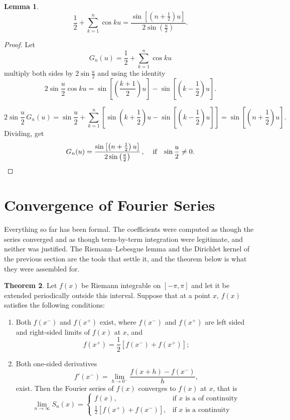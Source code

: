 \documentclass[12pt,a4paper]{report}
\theoremstyle{definition}
\newtheorem{thm}{Theorem}[section]
\theoremstyle{plain}
\newtheorem{lem}[thm]{Lemma}
\begin{document}
\begin{lem}
$$\frac{1}{2} + \sum_{k = 1}^n\cos ku = \frac{\sin\left[(n + \frac{1}{2})u\right]}{2\sin\left(\frac{u}{2}\right)}.$$
\end{lem}

\begin{proof}
Let $$G_n(u) = \frac{1}{2} + \sum^n_{k = 1}\cos ku$$ multiply both sides by $2\sin \frac{u}{2}$ and using the identity $$2\sin \frac{u}{2}\cos ku = \sin \left[\left(\frac{k + 1}{2}\right)u\right] - \sin\left[\left(k - \frac{1}{2}\right)u\right].$$

$$2\sin \frac{u}{2}\, G_n(u) = \sin \frac{u}{2} + \sum^n_{k = 1} \left[\sin\left(k + \frac{1}{2}\right)u - \sin\left[\left(k - \frac{1}{2}\right)u\right]\right] = \sin\left[\left(n + \frac{1}{2}\right)u\right].$$
Dividing, get $$G_n(u) = \frac{\sin\left[\left(n + \frac{1}{2}\right)u\right]}{2\sin\left(\frac{u}{2}\right)}\, , \hspace{0.4cm} \text{if}\hspace{0.3cm} \sin \frac{u}{2}\neq 0.$$
\end{proof}




\section{Convergence of Fourier Series}

Everything so far has been formal. The coefficients were computed as though the
series converged and as though term-by-term integration were legitimate, and
neither was justified. The Riemann--Lebesgue lemma and the Dirichlet kernel of
the previous section are the tools that settle it, and the theorem below is
what they were assembled for.

\begin{thm}
\label{thm:fourierconv}
Let $f(x)$ be Riemann integrable on $[-\pi,\pi]$ and let it be extended periodically outside this interval. Suppose that at a point $x$, $f(x)$ satisfies the following conditions:
\begin{enumerate}
\item[(i).] Both $f(x^-)$ and $f(x^+)$ exist, where $f(x^-)$ and $f(x^+)$ are left sided and right-sided limits of $f(x)$ at $x$, and $$f(x^+)= \frac{1}{2}\left[f(x^-) + f(x^+)\right];$$
\item[(ii).] Both one-sided derivatives
$$f'(x^-) = \lim_{h\rightarrow 0^-} \frac{f(x + h) - f(x^-)}{h},$$ exist. Then the  Fourier series of $f(x)$ converges to $f(x)$ at $x$, that is
$$\lim_{n\rightarrow \infty} S_n(x) = \begin{cases}
                                       f(x) , & \text{if}\,\, x\,\, \text{is a of continuity}\\
                                       \frac{1}{2}\left[f(x^+) + f(x^-)\right], & \text{if}\,\, x\,\, \text{is a continuity}
                                    \end{cases}$$
\end{enumerate}
\end{thm}
\end{document}
